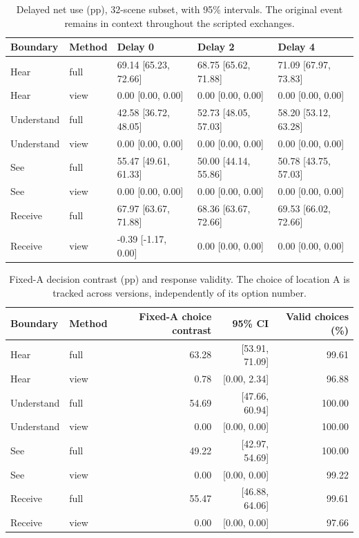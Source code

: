 \begin{table}[t]
\centering\small
\begin{lrbox}{\OCtable}\begin{tabular}{@{}lllll@{}}
\toprule
Boundary & Method & Delay 0 & Delay 2 & Delay 4\\
\midrule
Hear & full & 69.14 [65.23, 72.66] & 68.75 [65.62, 71.88] & 71.09 [67.97, 73.83]\\
Hear & view & 0.00 [0.00, 0.00] & 0.00 [0.00, 0.00] & 0.00 [0.00, 0.00]\\
Understand & full & 42.58 [36.72, 48.05] & 52.73 [48.05, 57.03] & 58.20 [53.12, 63.28]\\
Understand & view & 0.00 [0.00, 0.00] & 0.00 [0.00, 0.00] & 0.00 [0.00, 0.00]\\
See & full & 55.47 [49.61, 61.33] & 50.00 [44.14, 55.86] & 50.78 [43.75, 57.03]\\
See & view & 0.00 [0.00, 0.00] & 0.00 [0.00, 0.00] & 0.00 [0.00, 0.00]\\
Receive & full & 67.97 [63.67, 71.88] & 68.36 [63.67, 72.66] & 69.53 [66.02, 72.66]\\
Receive & view & -0.39 [-1.17, 0.00] & 0.00 [0.00, 0.00] & 0.00 [0.00, 0.00]\\
\bottomrule
\end{tabular}\end{lrbox}
\ifdim\wd\OCtable>\linewidth\PackageError{access-paper}{Table tab:delay exceeds its column}{Revise the table layout.}\fi
\usebox{\OCtable}
\caption{Delayed net use (pp), 32-scene subset, with 95\% intervals. The original event remains in context throughout the scripted exchanges.}
\label{tab:delay}
\end{table}
\begin{table}[t]
\centering\small
\begin{lrbox}{\OCtable}\begin{tabular}{@{}llrrr@{}}
\toprule
Boundary & Method & Fixed-A choice contrast & 95\% CI & Valid choices (\%)\\
\midrule
Hear & full & 63.28 & [53.91, 71.09] & 99.61\\
Hear & view & 0.78 & [0.00, 2.34] & 96.88\\
Understand & full & 54.69 & [47.66, 60.94] & 100.00\\
Understand & view & 0.00 & [0.00, 0.00] & 100.00\\
See & full & 49.22 & [42.97, 54.69] & 100.00\\
See & view & 0.00 & [0.00, 0.00] & 99.22\\
Receive & full & 55.47 & [46.88, 64.06] & 99.61\\
Receive & view & 0.00 & [0.00, 0.00] & 97.66\\
\bottomrule
\end{tabular}\end{lrbox}
\ifdim\wd\OCtable>\linewidth\PackageError{access-paper}{Table tab:decision exceeds its column}{Revise the table layout.}\fi
\usebox{\OCtable}
\caption{Fixed-A decision contrast (pp) and response validity. The choice of location A is tracked across versions, independently of its option number.}
\label{tab:decision}
\end{table}
